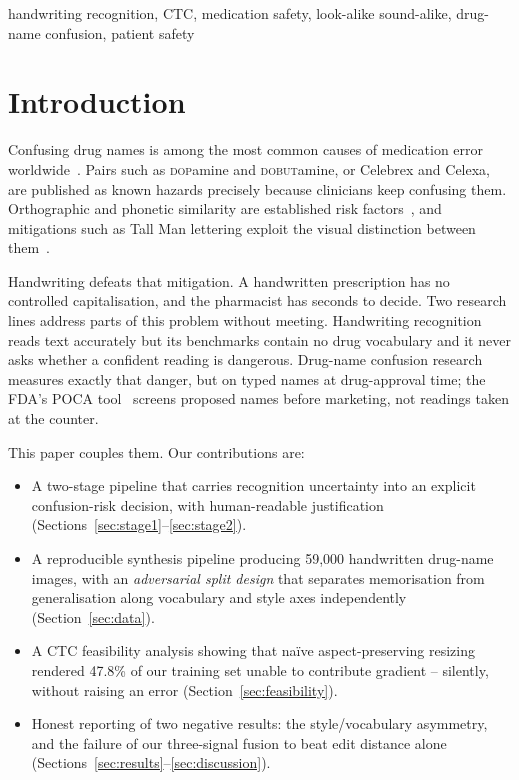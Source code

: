 \documentclass[conference]{IEEEtran}
\begin{document}
\begin{IEEEkeywords}
handwriting recognition, CTC, medication safety, look-alike sound-alike,
drug-name confusion, patient safety
\end{IEEEkeywords}

\section{Introduction}
Confusing drug names is among the most common causes of medication error
worldwide~\cite{who2007lasa}. Pairs such as \textsc{dop}amine and
\textsc{dobut}amine, or Celebrex and Celexa, are published as known hazards
precisely because clinicians keep confusing them. Orthographic and phonetic
similarity are established risk factors~\cite{lambert1999similarity}, and
mitigations such as Tall Man lettering exploit the visual distinction between
them~\cite{filik2004tallman}.

Handwriting defeats that mitigation. A handwritten prescription has no
controlled capitalisation, and the pharmacist has seconds to decide. Two
research lines address parts of this problem without meeting. Handwriting
recognition~\cite{shi2017crnn,puigcerver2017mdlstm,li2023trocr} reads text
accurately but its benchmarks contain no drug vocabulary and it never asks
whether a confident reading is dangerous. Drug-name confusion
research~\cite{kondrak2006confusable,emmerton2020lasasoftware} measures exactly
that danger, but on typed names at drug-approval time; the FDA's POCA
tool~\cite{fda2009poca} screens proposed names before marketing, not readings
taken at the counter.

This paper couples them. Our contributions are:

\begin{itemize}
\item A two-stage pipeline that carries recognition uncertainty into an
explicit confusion-risk decision, with human-readable justification
(Sections~\ref{sec:stage1}--\ref{sec:stage2}).
\item A reproducible synthesis pipeline producing 59{,}000 handwritten
drug-name images, with an \emph{adversarial split design} that separates
memorisation from generalisation along vocabulary and style axes
independently (Section~\ref{sec:data}).
\item A CTC feasibility analysis showing that na\"ive aspect-preserving
resizing rendered 47.8\% of our training set unable to contribute gradient --
silently, without raising an error (Section~\ref{sec:feasibility}).
\item Honest reporting of two negative results: the style/vocabulary asymmetry,
and the failure of our three-signal fusion to beat edit distance alone
(Sections~\ref{sec:results}--\ref{sec:discussion}).
\end{itemize}
\end{document}
